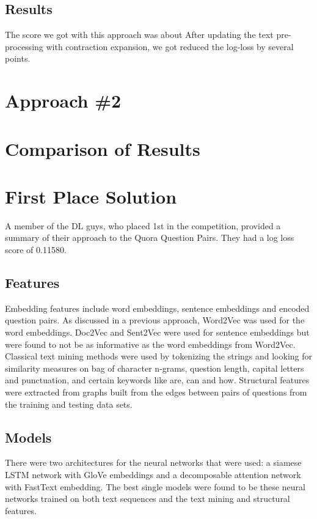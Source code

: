 \documentclass{article}
\begin{document}
\subsection{Results}

The score we got with this approach was about %
After updating the text pre-processing with contraction expansion,
we got reduced the log-loss by several points.

\section{Approach \#2}

\section{Comparison of Results}

\section{First Place Solution}

A member of the DL guys, who placed 1st in the competition, provided a summary
of their approach to the Quora Question Pairs. They had a log loss score of
0.11580.

\subsection{Features}

Embedding features include word embeddings, sentence embeddings and encoded
question pairs. As discussed in a previous approach, Word2Vec was used for the
word embeddings. Doc2Vec and Sent2Vec were used for sentence embeddings but
were found to not be as informative as the word embeddings from Word2Vec. Classical text mining methods were used by tokenizing the strings and looking
for similarity measures on bag of character n-grams, question length, capital
letters and punctuation, and certain keywords like are, can and how. Structural
features were extracted from graphs built from the edges between pairs of
questions from the training and testing data sets.

\subsection{Models}

There were two architectures for the neural networks that were used: a siamese
LSTM network with GloVe embeddings and a decomposable attention network with
FastText embedding. The best single models were found to be these neural
networks trained on both text sequences and the text mining and structural
features.
\end{document}

